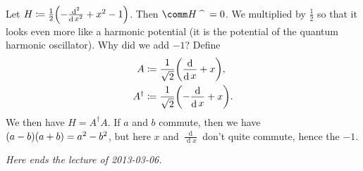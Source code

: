 \documentclass[10pt]{article}
\DeclarePairedDelimiter\of{\lparen}{\rparen}
\DeclareMathOperator{\diffd}{d}
\newcommand\ft\widehat
\newcommand{\adj}{^\dagger}
\newcommand\fstderiv[2][]{\frac{\diffd #1}{\diffd #2}}
\newcommand\nthderiv[3][]{\frac{\diffd^#3 #1}{{\diffd #2}^#3}}
\begin{document}
  Let $H \coloneqq \frac{1}{2}\of*{-\nthderiv{x}{2}+x^2-1}$. Then $\comm H {\ft\quad}=0$. We multiplied by $\frac{1}{2}$ so that it looks even more like a harmonic potential (it is the potential of the quantum harmonic oscillator). Why did we add $-1$? Define
  \begin{align*}
    A &\coloneqq \frac{1}{\sqrt 2}\of*{\fstderiv{x} + x},\\
    A\adj &\coloneqq \frac{1}{\sqrt 2}\of*{-\fstderiv{x} + x}.
  \end{align*}
  We then have $H = A\adj A$. If $a$ and $b$ commute, then we have $\of*{a-b}\of*{a+b}  = a^2-b^2$, but here $x$ and $\fstderiv{x}$ don't quite commute, hence the $-1$.

\emph{Here ends the lecture of 2013-03-06.}
\end{document}
